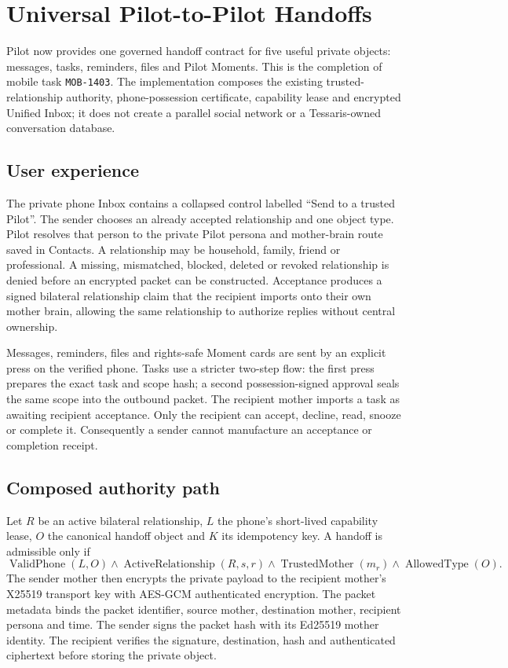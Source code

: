\section{Universal Pilot-to-Pilot Handoffs}
\label{sec:pilot-universal-handoffs}

Pilot now provides one governed handoff contract for five useful private objects:
messages, tasks, reminders, files and Pilot Moments.  This is the completion of
mobile task \texttt{MOB-1403}.  The implementation composes the existing trusted-
relationship authority, phone-possession certificate, capability lease and encrypted
Unified Inbox; it does not create a parallel social network or a Tessaris-owned
conversation database.

\subsection{User experience}

The private phone Inbox contains a collapsed control labelled ``Send to a trusted
Pilot''.  The sender chooses an already accepted relationship and one object type.
Pilot resolves that person to the private Pilot persona and mother-brain route saved
in Contacts.  A relationship may be household, family, friend or professional.  A
missing, mismatched, blocked, deleted or revoked relationship is denied before an
encrypted packet can be constructed.  Acceptance produces a signed bilateral
relationship claim that the recipient imports onto their own mother brain, allowing
the same relationship to authorize replies without central ownership.

Messages, reminders, files and rights-safe Moment cards are sent by an explicit press
on the verified phone.  Tasks use a stricter two-step flow: the first press prepares
the exact task and scope hash; a second possession-signed approval seals the same
scope into the outbound packet.  The recipient mother imports a task as awaiting
recipient acceptance.  Only the recipient can accept, decline, read, snooze or
complete it.  Consequently a sender cannot manufacture an acceptance or completion
receipt.

\subsection{Composed authority path}

Let $R$ be an active bilateral relationship, $L$ the phone's short-lived capability
lease, $O$ the canonical handoff object and $K$ its idempotency key.  A handoff is
admissible only if
\[
  \operatorname{ValidPhone}(L,O) \land
  \operatorname{ActiveRelationship}(R,s,r) \land
  \operatorname{TrustedMother}(m_r) \land
  \operatorname{AllowedType}(O).
\]
The sender mother then encrypts the private payload to the recipient mother's X25519
transport key with AES-GCM authenticated encryption.  The packet metadata binds the
packet identifier, source mother, destination mother, recipient persona and time.
The sender signs the packet hash with its Ed25519 mother identity.  The recipient
verifies the signature, destination, hash and authenticated ciphertext before storing
the private object.

